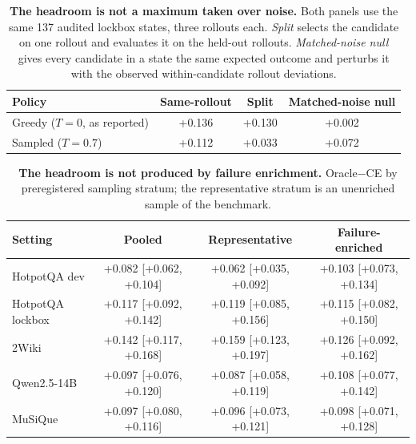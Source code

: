 \begin{table}[t]
\centering
\small
\caption{\textbf{The headroom is not a maximum taken over noise.}
Both panels use the same 137 audited lockbox states, three rollouts each.
\emph{Split} selects the candidate on one rollout and evaluates it on the
held-out rollouts. \emph{Matched-noise null} gives every candidate in a
state the same expected outcome and perturbs it with the observed
within-candidate rollout deviations.}
\label{tab:placebo}
\begin{tabular}{lccc}
\toprule
\textbf{Policy} & \textbf{Same-rollout} & \textbf{Split} & \textbf{Matched-noise null} \\
\midrule
Greedy ($T{=}0$, as reported) & +0.136 & +0.130 & +0.002 \\
Sampled ($T{=}0.7$) & +0.112 & +0.033 & +0.072 \\
\bottomrule
\end{tabular}
\end{table}

\begin{table}[t]
\centering
\small
\caption{\textbf{The headroom is not produced by failure enrichment.}
Oracle$-$CE by preregistered sampling stratum; the representative stratum
is an unenriched sample of the benchmark.}
\label{tab:stratum}
\begin{tabular}{lccc}
\toprule
\textbf{Setting} & \textbf{Pooled} & \textbf{Representative} & \textbf{Failure-enriched} \\
\midrule
HotpotQA dev & +0.082 [+0.062, +0.104] & +0.062 [+0.035, +0.092] & +0.103 [+0.073, +0.134] \\
HotpotQA lockbox & +0.117 [+0.092, +0.142] & +0.119 [+0.085, +0.156] & +0.115 [+0.082, +0.150] \\
2Wiki & +0.142 [+0.117, +0.168] & +0.159 [+0.123, +0.197] & +0.126 [+0.092, +0.162] \\
Qwen2.5-14B & +0.097 [+0.076, +0.120] & +0.087 [+0.058, +0.119] & +0.108 [+0.077, +0.142] \\
MuSiQue & +0.097 [+0.080, +0.116] & +0.096 [+0.073, +0.121] & +0.098 [+0.071, +0.128] \\
\bottomrule
\end{tabular}
\end{table}

